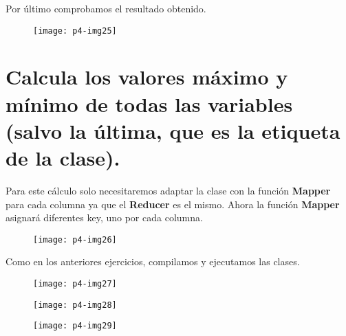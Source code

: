 \documentclass[10pt]{article}
\begin{document}
Por último comprobamos el resultado obtenido. \\

\begin{figure}[H]
	\begin{center}
 		\texttt{[image: p4-img25]}
	\end{center} 
\end{figure}


\section{Calcula los valores máximo y mínimo de todas las variables (salvo la última, que es la  etiqueta de la clase).} 
Para este cálculo solo necesitaremos adaptar la clase con la función \textbf{Mapper} para cada columna ya que el \textbf{Reducer} es el mismo. Ahora la función \textbf{Mapper} asignará diferentes key, uno por cada columna. \\

\begin{figure}[H]
	\begin{center}
 		\texttt{[image: p4-img26]}
	\end{center} 
\end{figure}

Como en los anteriores ejercicios, compilamos y ejecutamos las clases. \\

\begin{figure}[H]
	\begin{center}
 		\texttt{[image: p4-img27]}
	\end{center} 
\end{figure}

\begin{figure}[H]
	\begin{center}
 		\texttt{[image: p4-img28]}
	\end{center} 
\end{figure}

\begin{figure}[H]
	\begin{center}
 		\texttt{[image: p4-img29]}
	\end{center} 
\end{figure}
\end{document}
